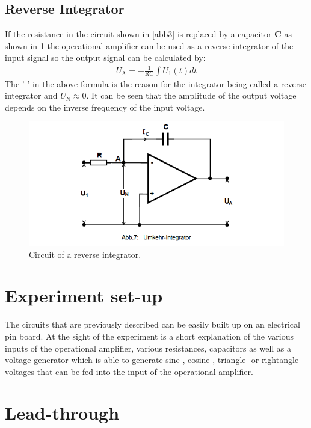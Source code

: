 \subsection{Reverse Integrator}
If the resistance in the circuit shown in \ref{abb3} is replaced by a capacitor \textbf{C}
as shown in \ref{abb5} the operational amplifier can be used as a reverse integrator
of the input signal so the output signal can be calculated by:
\begin{align*}
    U_{\text{A}} = -\frac{1}{\text{RC}} \int U_1(t) dt
\end{align*}
The '-' in the above formula is the reason for the integrator being called a reverse
integrator and $U_{\text{N}} \approx 0$.
It can be seen that the amplitude of the output voltage depends on the inverse frequency
of the input voltage.
\FloatBarrier
\begin{figure}
  \centering
  \includegraphics[scale=0.5]{integrator.PNG}
  \caption{Circuit of a reverse integrator. \cite{Q1}}
  \label{abb5}
\end{figure}
\FloatBarrier

\section{Experiment set-up}
The circuits that are previously described can be easily built up on an electrical
pin board. At the sight of the experiment is a short explanation of the various inputs
of the operational amplifier, various resistances, capacitors as well as a voltage generator which is able to
generate sine-, cosine-, triangle- or rightangle- voltages that can be fed into the
input of the operational amplifier.

\section{Lead-through}

